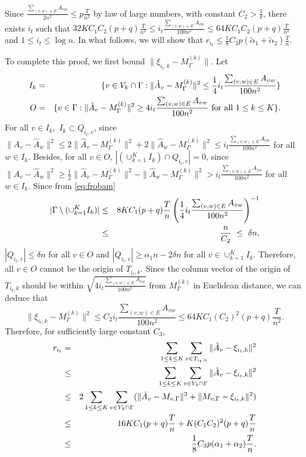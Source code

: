Since $\frac{\sum_{(v,w) \in E } A_{vw}}{2n^2} \le p\frac{T}{n^2}$ by
law of large numbers, with constant $C_2>\frac{1}{\delta}$, there exists $i_t$ such that
$32K C_1 C_2(p+q)\frac{T}{n^2} \le i_t \frac{\sum_{(v,w) \in E } A_{vw}
}{100n^2} \le  64K C_1 C_2(p+q)\frac{T}{n^2}$ and $1\le i_t \le \log
n$. In what follows, we will show that $r_{i_t} \le \frac{1}{8} C_3 p(\tilde{\alpha}_1 +
\tilde{\alpha}_2)\frac{T}{n} .$ 


To complete this proof, we first bound
$\|\xi_{i_t,k}-M_{\Gamma}^{(k)}\|$. Let 
\begin{eqnarray*}
I_k & = &\{ v \in V_k \cap \Gamma : \|\hat{A}_v - M_{\Gamma}^{(k)} \|^2 \le \frac{1}{4}i_t \frac{\sum_{(v,w) \in E } A_{vw}
}{100n^2} \} \cr
O & = &\{ v \in \Gamma : \|\hat{A}_v - M_{\Gamma}^{(k)}
\|^2 \ge 4 i_t \frac{\sum_{(v,w) \in E } A_{vw}}{100n^2}~\mbox{for all}~ 1\le
k\le K \}.
\end{eqnarray*}
For all $v\in I_k,$ $I_k \subset Q_{i_t , v}$, since $\|\hat{A}_v - \hat{A}_w \|^2 \le
2\|\hat{A}_v -M_{\Gamma}^{(k)}\|^2 + 2\|\hat{A}_w
-M_{\Gamma}^{(k)}\|^2 \le i_t \frac{\sum_{(v,w) \in E } A_{vw}
}{100n^2} $ for all $w \in I_k$.  
Besides, for all $v\in O$, $|(\cup_{k=1}^{K} I_k) \cap
Q_{i_t , v} | =0$, since $\|\hat{A}_v - \hat{A}_w \|^2 \ge
\frac{1}{2}\|\hat{A}_v -M_{\Gamma}^{(k)}\|^2 - \|\hat{A}_w
-M_{\Gamma}^{(k)}\|^2 > i_t \frac{\sum_{(v,w) \in E } A_{vw}
}{100n^2} $ for all $w \in I_k$. Since from \eqref{eq:frobam}
\begin{eqnarray*}
|\Gamma \setminus (\cup_{k=1}^KI_k) | &\le&  8K C_1 (p+q)\frac{T}{n} \left(\frac{1}{4}i_t \frac{\sum_{(v,w) \in E } A_{vw}
}{100n^2}\right)^{-1}\cr
&\le&\frac{n}{C_2} ~\le ~ \delta n,
\end{eqnarray*}
$|Q_{i_t , v}| \le \delta n$ for all $v \in O$ and $|Q_{i_t , v}| \ge
\alpha_1 n - 2\delta n $ for all $v \in \cup_{k=1}^K I_k$.
Therefore, all $v \in O$ cannot be the origin of $T_{i_t, k}$. Since
the column vector of the origin of $T_{i_t , k}$ should be within
$\sqrt{4 i_t \frac{\sum_{(v,w) \in E } A_{vw}}{100n^2}}$ from
$M_{\Gamma}^{(k)}$ in Euclidean
distance,  we can deduce that
$$\| \xi_{i_t,k} - M_{\Gamma}^{(k)}\|^2 \le C_2 i_t \frac{\sum_{(v,w) \in E } A_{vw}
}{100n^2} \le 64KC_1(C_2)^2(p+q)\frac{T}{n^2}.$$
Therefore, for sufficiently large constant $C_3$, 
\begin{eqnarray*}
r_{i_t} & =& \sum_{1\le k \le K}\sum_{v \in T_{i_t,k}} \| \hat{A}_v
-\xi_{i_t,k} \|^2 \cr
&\le& \sum_{1\le k \le K}\sum_{v \in V_{k}\cap \Gamma} \| \hat{A}_v
-\xi_{i_t,k} \|^2 \cr
&\le& 2\sum_{1\le k \le K}\sum_{v \in V_{k} \cap \Gamma} ( \| \hat{A}_v
-M_{v,\Gamma}\|^2 +\|M_{v,\Gamma}-\xi_{i_t,k} \|^2 )\cr
&\le&16K C_1 (p+q)\frac{T}{n}+ K(C_1C_2)^2(p+q)\frac{T}{n} \cr
&\le&\frac{1}{8} C_3 p(\alpha_1 +\alpha_2)\frac{T}{n} .
\end{eqnarray*}



